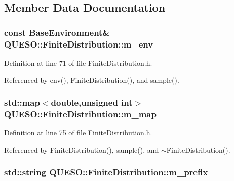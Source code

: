 \subsection{Member Data Documentation}
\hypertarget{class_q_u_e_s_o_1_1_finite_distribution_a1e3d075444dbb96d4d31b51a7eafed41}{
\subsubsection[{m\-\_\-env}]{\setlength{\rightskip}{0pt plus 5cm}const {\bf Base\-Environment}\& Q\-U\-E\-S\-O\-::\-Finite\-Distribution\-::m\-\_\-env\hspace{0.3cm}{\ttfamily [protected]}}}\label{class_q_u_e_s_o_1_1_finite_distribution_a1e3d075444dbb96d4d31b51a7eafed41}


Definition at line 71 of file Finite\-Distribution.\-h.



Referenced by env(), Finite\-Distribution(), and sample().

\hypertarget{class_q_u_e_s_o_1_1_finite_distribution_a7b0ba94a9f10793519056eaf612cbeb1}{
\subsubsection[{m\-\_\-map}]{\setlength{\rightskip}{0pt plus 5cm}std\-::map$<$double,unsigned int$>$ Q\-U\-E\-S\-O\-::\-Finite\-Distribution\-::m\-\_\-map\hspace{0.3cm}{\ttfamily [protected]}}}\label{class_q_u_e_s_o_1_1_finite_distribution_a7b0ba94a9f10793519056eaf612cbeb1}


Definition at line 75 of file Finite\-Distribution.\-h.



Referenced by Finite\-Distribution(), sample(), and $\sim$\-Finite\-Distribution().

\hypertarget{class_q_u_e_s_o_1_1_finite_distribution_a0e437054e07abf8fbc80d5a5bb14c27d}{
\subsubsection[{m\-\_\-prefix}]{\setlength{\rightskip}{0pt plus 5cm}std\-::string Q\-U\-E\-S\-O\-::\-Finite\-Distribution\-::m\-\_\-prefix\hspace{0.3cm}{\ttfamily [protected]}}}\label{class_q_u_e_s_o_1_1_finite_distribution_a0e437054e07abf8fbc80d5a5bb14c27d}


